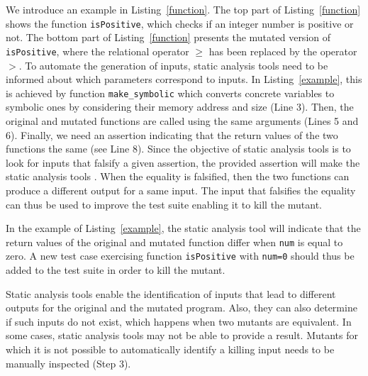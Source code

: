 We introduce an example in Listing~\ref{function}. The top part of Listing~\ref{function} shows the function \texttt{isPositive}, which checks if an integer number is positive or not. The bottom part of Listing~\ref{function} presents the mutated version of \texttt{isPositive}, where the relational operator $\geq$ has been replaced by the operator $>$.
To automate the generation of inputs, static analysis tools need to be informed about which parameters correspond to inputs. 
In Listing~\ref{example}, this is achieved by function \texttt{make\_symbolic} which converts concrete variables to symbolic ones by considering their memory address and size (Line 3). 
Then, the original and mutated functions are called using the same arguments (Lines 5 and 6).
Finally, we need an assertion indicating that the return values of the two functions the same (see Line 8).
Since the objective of static analysis tools is to look for inputs that falsify a given assertion, the provided assertion
will make the static analysis tools . 
When the equality is falsified, then the two functions can produce a different output for a same input.
The input that falsifies the equality can thus be used to improve the test suite enabling it to kill the mutant.

In the example of Listing~\ref{example}, the static analysis tool will indicate that the return values of the original and mutated function differ when \texttt{num} is equal to zero.
A new test case exercising function \texttt{isPositive} with \texttt{num=0} should thus be added to the test suite in order to kill the mutant.





Static analysis tools enable the identification of inputs that lead to different outputs for the original and the mutated program.
Also, they can also determine if such inputs do not exist, which happens when two mutants are equivalent.
In some cases, static analysis tools may not be able to provide a result.
Mutants for which it is not possible to automatically identify a killing input needs to be manually inspected (Step 3).
 
